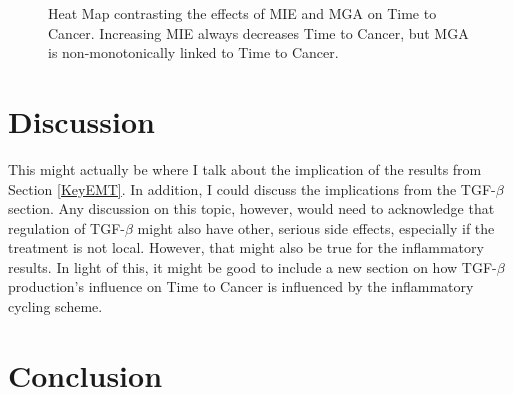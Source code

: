 \documentclass{article}
\begin{document}
\begin{figure}[H]
\center
{}
\caption{Heat Map contrasting the effects of MIE and MGA on Time to Cancer. Increasing MIE always decreases Time to Cancer, but MGA is non-monotonically linked to Time to Cancer.}
\label{fig:MIEvsMGA}
\end{figure}

\section{Discussion}\label{Discussion}
This might actually be where I talk about the implication of the results from Section \ref{KeyEMT}.
In addition, I could discuss the implications from the TGF-$\beta$ section.
Any discussion on this topic, however, would need to acknowledge that regulation of TGF-$\beta$ might also have other, serious side effects, especially if the treatment is not local.
However, that might also be true for the inflammatory results.
In light of this, it might be good to include a new section on how TGF-$\beta$ production's influence on Time to Cancer is influenced by the inflammatory cycling scheme.


\section{Conclusion}\label{Conclusion}
\end{document}

